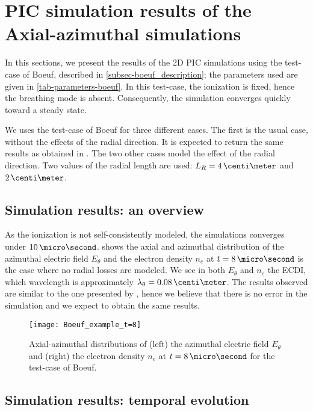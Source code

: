 
\section{PIC simulation results of the Axial-azimuthal simulations}
  \label{sec-Zthetaresults}
  In this sections, we present the results of the \ac{2D} \ac{PIC} simulations using the test-case of Boeuf, described in \cref{subsec-boeuf_description}; the parameters used are given in \vref{tab-parameters-boeuf}.
  In this test-case, the ionization is fixed, hence the breathing mode is absent.
  Consequently, the simulation converges quickly toward a steady state.
  
  We uses the test-case of Boeuf for three different cases.
  The first is the usual case, without the effects of the radial direction.
  It is expected to return the same results as obtained in \citet{boeuf2018}.
  The two other cases model the effect of the radial direction.
  Two values of the radial length are used\string: $L_R=4\,\centi\meter$ and $2\,\centi\meter$.

  
  \subsection{Simulation results\string: an overview} \label{subsec-boeuf-overview}
  As the ionization is not self-consistently modeled, the simulations converges under $10\,\micro\second$.
   shows the axial and azimuthal distribution of the azimuthal electric field $E_{\theta}$ and the electron density $n_e$ at $t=8\,\micro\second$ is the case where no radial losses are modeled.
  We see in both $E_{\theta}$ and $n_e$ the \ac{ECDI}, which wavelength is approximately $\lambda_{\theta} = 0.08\,\centi\meter$.
  The results observed are similar to the one presented by \citet{boeuf2018}, hence we believe that there is no error in the simulation and we expect to obtain the same results.

  \begin{figure}[hbt]
    \centering
    \texttt{[image: Boeuf\_example\_t=8]}
    \caption{ Axial-azimuthal distributions of (left) the azimuthal electric field $E_{\theta}$ and (right) the electron density $n_e$ at $t=8\,\micro\second$ for the test-case of Boeuf. } 
    \label{fig-overview_boeuf_neEx}
  \end{figure}

  \subsection{Simulation results\string: temporal evolution} \label{subsec-temp_boeuf}
  
